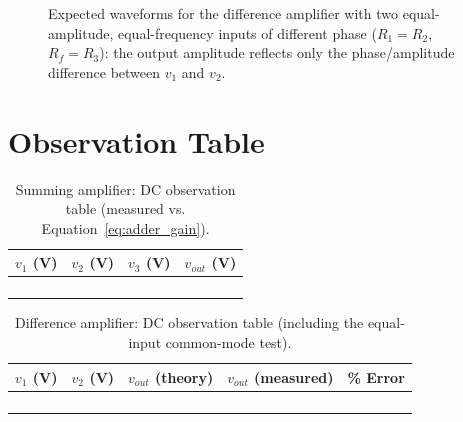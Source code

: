 \begin{figure}[h!]
	\centering
	\caption{Expected waveforms for the difference amplifier with two equal-amplitude, equal-frequency inputs of different phase ($R_1=R_2$, $R_f=R_3$): the output amplitude reflects only the phase/amplitude difference between $v_1$ and $v_2$.}
	\label{fig:wave_subtractor}
\end{figure}

\section{Observation Table}

\begin{table}[h!]
	\centering
	\begin{tabular}{@{}cccc@{}}
		\toprule
		$v_1$ (V) & $v_2$ (V) & $v_3$ (V) & $v_{out}$ (V) \\
		\midrule
		&  &  &  \\
		&  &  &  \\
		&  &  &  \\
		&  &  &  \\
		\bottomrule
	\end{tabular}
	\caption{Summing amplifier: DC observation table (measured vs. Equation~\eqref{eq:adder_gain}).}
	\label{tab:adder_obs}
\end{table}

\begin{table}[h!]
	\centering
	\begin{tabular}{@{}ccccc@{}}
		\toprule
		$v_1$ (V) & $v_2$ (V) & $v_{out}$ (theory) & $v_{out}$ (measured) & \% Error \\
		\midrule
		&  &  &  &  \\
		&  &  &  &  \\
		&  &  &  &  \\
		&  &  &  &  \\
		\bottomrule
	\end{tabular}
	\caption{Difference amplifier: DC observation table (including the equal-input common-mode test).}
	\label{tab:subtractor_obs}
\end{table}

